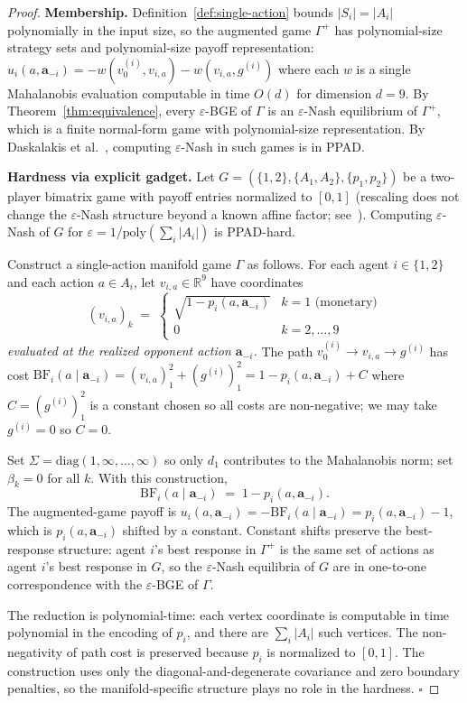 \documentclass[11pt]{article}
\theoremstyle{definition}
\theoremstyle{remark}
\newcommand{\BF}{\mathrm{BF}}
\newcommand{\R}{\mathbb{R}}
\begin{document}
\begin{proof}
\textbf{Membership.} Definition~\ref{def:single-action} bounds $|S_i| = |A_i|$ polynomially in the
input size, so the augmented game $\Gamma^+$ has polynomial-size strategy sets and polynomial-size
payoff representation: $u_i(a, \mathbf{a}_{-i}) = -w(v_0^{(i)}, v_{i,a}) - w(v_{i,a}, g^{(i)})$ where
each $w$ is a single Mahalanobis evaluation computable in time $O(d)$ for dimension $d = 9$. By
Theorem~\ref{thm:equivalence}, every $\varepsilon$-BGE of $\Gamma$ is an $\varepsilon$-Nash
equilibrium of $\Gamma^+$, which is a finite normal-form game with polynomial-size representation. By
Daskalakis et al.~\cite{daskalakis2009}, computing $\varepsilon$-Nash in such games is in
\textsc{PPAD}.

\textbf{Hardness via explicit gadget.} Let $G = (\{1,2\}, \{A_1, A_2\}, \{p_1, p_2\})$ be a two-player
bimatrix game with payoff entries normalized to $[0,1]$ (rescaling does not change the
$\varepsilon$-Nash structure beyond a known affine factor; see~\cite{chen2009}). Computing
$\varepsilon$-Nash of $G$ for $\varepsilon = 1/\mathrm{poly}(\sum_i |A_i|)$ is \textsc{PPAD}-hard.

Construct a single-action manifold game $\Gamma$ as follows. For each agent $i \in \{1,2\}$ and each
action $a \in A_i$, let $v_{i,a} \in \R^9$ have coordinates
\[
(v_{i,a})_k \;=\; \begin{cases}
\sqrt{1 - p_i(a, \mathbf{a}_{-i})} & k = 1 \text{ (monetary)} \\
0 & k = 2, \ldots, 9
\end{cases}
\]
\emph{evaluated at the realized opponent action $\mathbf{a}_{-i}$.} The path
$v_0^{(i)} \to v_{i,a} \to g^{(i)}$ has cost
$\BF_i(a \mid \mathbf{a}_{-i}) = (v_{i,a})_1^2 + (g^{(i)})_1^2 = 1 - p_i(a, \mathbf{a}_{-i}) + C$ where
$C = (g^{(i)})_1^2$ is a constant chosen so all costs are non-negative; we may take $g^{(i)} = 0$ so
$C = 0$.

Set $\Sigma = \mathrm{diag}(1, \infty, \ldots, \infty)$ so only $d_1$ contributes to the Mahalanobis
norm; set $\beta_k = 0$ for all $k$. With this construction,
\[
\BF_i(a \mid \mathbf{a}_{-i}) \;=\; 1 - p_i(a, \mathbf{a}_{-i}).
\]
The augmented-game payoff is $u_i(a, \mathbf{a}_{-i}) = -\BF_i(a \mid \mathbf{a}_{-i}) =
p_i(a, \mathbf{a}_{-i}) - 1$, which is $p_i(a, \mathbf{a}_{-i})$ shifted by a constant. Constant
shifts preserve the best-response structure: agent $i$'s best response in $\Gamma^+$ is the same set
of actions as agent $i$'s best response in $G$, so the $\varepsilon$-Nash equilibria of $G$ are in
one-to-one correspondence with the $\varepsilon$-BGE of $\Gamma$.

The reduction is polynomial-time: each vertex coordinate is computable in time polynomial in the
encoding of $p_i$, and there are $\sum_i |A_i|$ such vertices. The non-negativity of path cost is
preserved because $p_i$ is normalized to $[0,1]$. The construction uses only the diagonal-and-degenerate
covariance and zero boundary penalties, so the manifold-specific structure plays no role in the
hardness. $\square$
\end{proof}
\end{document}
